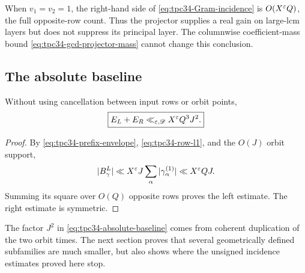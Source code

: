 \begin{remark}
\label{rem:tpc34-principal-v}
When \(v_1=v_2=1\), the right-hand side of
\eqref{eq:tpc34-Gram-incidence} is \(O(X^\varepsilon Q)\), the full opposite-row
count.  Thus the projector supplies a real gain on large-lcm layers but
does not suppress its principal layer.  The columnwise coefficient-mass
bound \eqref{eq:tpc34-gcd-projector-mass} cannot change this conclusion.
\end{remark}

\subsection{The absolute baseline}

\begin{proposition}
\label{prop:tpc34-absolute-baseline}
Without using cancellation between input rows or orbit points,
\begin{equation}
 \boxed{
 E_L+E_R\ll_{\varepsilon,\mathscr D}X^\varepsilon Q^3J^2.}
 \label{eq:tpc34-absolute-baseline}
\end{equation}
\end{proposition}

\begin{proof}
By \eqref{eq:tpc34-prefix-envelope},
\eqref{eq:tpc34-row-l1}, and the \(O(J)\) orbit support,
\[
 |B_\gamma^L|
 \ll X^\varepsilon J\sum_\alpha|\gamma_\alpha^{(1)}|
 \ll X^\varepsilon QJ.
\]
Summing its square over \(O(Q)\) opposite rows proves the left estimate.
The right estimate is symmetric.
\end{proof}

The factor \(J^2\) in \eqref{eq:tpc34-absolute-baseline} comes from
coherent duplication of the two orbit times.  The next section proves
that several geometrically defined subfamilies are much smaller, but also
shows where the unsigned incidence estimates proved here stop.
